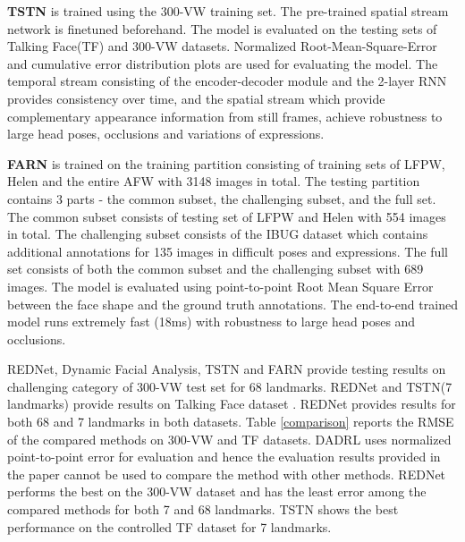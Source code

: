 \documentclass{llncs}
\begin{document}
\textbf{TSTN} \cite{tstn} is trained using the 300-VW training set. The pre-trained spatial stream network is finetuned beforehand. The model is evaluated on the testing sets of Talking Face(TF) and 300-VW datasets. Normalized Root-Mean-Square-Error and cumulative error distribution plots are used for evaluating the model. The temporal stream consisting of the encoder-decoder module and the 2-layer RNN provides consistency over time, and the spatial stream which provide complementary appearance information from still frames, achieve robustness to large head poses, occlusions and variations of expressions. 

\textbf{FARN} \cite{farn} is trained on the training partition consisting of training sets of LFPW, Helen and the entire AFW with 3148 images in total. The testing partition contains 3 parts - the common subset, the challenging subset, and the full set. The common subset consists of testing set of LFPW and Helen with 554 images in total. The challenging subset consists of the IBUG dataset which contains additional annotations for 135 images in difficult poses and expressions. The full set consists of both the common subset and the challenging subset with 689 images. The model is evaluated using point-to-point Root Mean Square Error between the face shape and the ground truth annotations. The end-to-end trained model runs extremely fast (18ms) with robustness to large head poses and occlusions.

REDNet\cite{rednet}, Dynamic Facial Analysis\cite{dynamic_facial_analysis}, TSTN\cite{tstn} and FARN\cite{farn} provide testing results on challenging category of 300-VW test set for 68 landmarks. REDNet\cite{rednet} and TSTN\cite{tstn}(7 landmarks) provide results on Talking Face dataset \cite{tf}. REDNet\cite{rednet} provides results for both 68 and 7 landmarks in both datasets.
Table \ref{comparison} reports the RMSE of the compared methods on 300-VW and TF\cite{tf} datasets.
DADRL\cite{dadrl} uses normalized point-to-point error for evaluation and hence the evaluation results provided in the paper cannot be used to compare the method with other methods.
REDNet\cite{rednet} performs the best on the 300-VW dataset and has the least error among the compared methods for both 7 and 68 landmarks. TSTN\cite{tstn} shows the best performance on the controlled TF dataset for 7 landmarks.
\end{document}

